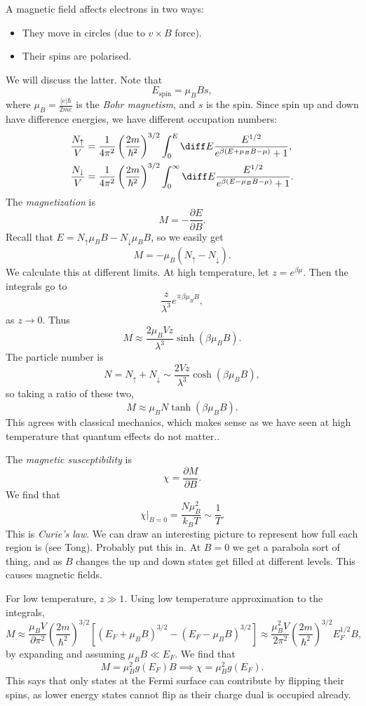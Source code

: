 \documentclass[12pt]{article}
\begin{document}
A magnetic field affects electrons in two ways:
\begin{itemize}
	\item They move in circles (due to $v \times B$ force).
	\item Their spins are polarised.
\end{itemize}
We will discuss the latter. Note that
\[
E_{\mathrm{spin}} = \mu_B B s,
\]
where $\mu_B = \frac{|e| \hbar}{2mc}$ is the \emph{Bohr magnetism}, and $s$ is the spin. Since spin up and down have difference energies, we have different occupation numbers:
\begin{align*}
	\frac{N_\uparrow}{V} &= \frac{1}{4 \pi^2} \left( \frac{2m}{\hbar^2} \right)^{3/2} \int_0^E \diff E \frac{E^{1/2}}{e^{\beta(E + \mu_B B - \mu)} + 1}, \\
	\frac{N_\downarrow}{V} &= \frac{1}{4\pi^2} \left( \frac{2m}{\hbar^2} \right)^{3/2} \int_0^\infty \diff E \frac{E^{1/2}}{e^{\beta(E - \mu_B B - \mu)} + 1}.
\end{align*}
The \emph{magnetization} is
\[
M = - \frac{\partial E}{\partial B}.
\]
Recall that $E = N_\uparrow \mu_B B - N_\downarrow \mu_B B$, so we easily get
\[
M = - \mu_B (N_\uparrow  - N_\downarrow).
\]
We calculate this at different limits. At high temperature, let $z = e^{\beta \mu}$. Then the integrals go to
\[
\frac{z}{\lambda^3} e^{\mp \beta \mu_B B},
\]
as $z \to 0$. Thus
\[
M \approx \frac{2 \mu_B V z}{\lambda ^3} \sinh (\beta \mu_B B).
\]
The particle number is
\[
	N = N_\uparrow + N_\downarrow \sim \frac{2 V z}{\lambda^3} \cosh (\beta \mu_B B),
\]
so taking a ratio of these two,
\[
M \approx \mu_B N \tanh (\beta \mu_B B).
\]
This agrees with classical mechanics, which makes sense as we have seen at high temperature that quantum effects do not matter..

The \emph{magnetic susceptibility} is
\[
\chi = \frac{\partial M}{\partial B}.
\]
We find that
\[
\chi |_{B= 0} = \frac{N \mu_B^2}{k_B T} \sim \frac{1}{T}.
\]
This is \emph{Curie's law}. We can draw an interesting picture to represent how full each region is (see Tong). Probably put this in. At $B = 0$ we get a parabola sort of thing, and as $B$ changes the up and down states get filled at different levels. This causes magnetic fields.

For low temperature, $z \gg 1$. Using low temperature approximation to the integrals,
\[
	M \approx \frac{\mu_B V}{\partial \pi^2} \left( \frac{2m}{\hbar^2} \right)^{3/2} [(E_F + \mu_B B)^{3/2} - (E_F - \mu_B B)^{3/2}] \approx \frac{\mu_B^2 V}{2\pi^2} \left( \frac{2m}{\hbar^2} \right)^{3/2} E_F^{1/2}B,
\]
by expanding and assuming $\mu_B B \ll E_F$. We find that
\[
M = \mu_B^2 g(E_F) B \implies \chi = \mu_B^2 g(E_F).
\]
This says that only states at the Fermi surface can contribute by flipping their spins, as lower energy states cannot flip as their charge dual is occupied already.
\end{document}
